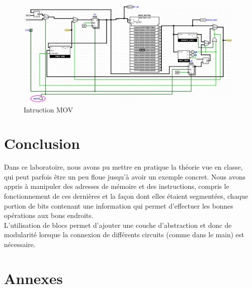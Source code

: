\documentclass[a4paper]{article} %
\begin{document}
\begin{figure}[H]
    \centering
    \includegraphics[width=1\textwidth]{src/FETCH_INTER_1c2c.png}
    \caption{Intruction MOV}
    \label{fetch_inter}
\end{figure}

\section{Conclusion}
Dans ce laboratoire, nous avons pu mettre en pratique la théorie vue en classe, qui peut parfois être un peu floue jusqu'à avoir un exemple concret. Nous avons appris à manipuler des adresses de mémoire et des instructions, compris le fonctionnement de ces dernières et la façon dont elles étaient segmentées, chaque portion de bits contenant une information qui permet d'effectuer les bonnes opérations aux bons endroits. \\
L'utilisation de blocs permet d'ajouter une couche d'abstraction et donc de modularité lorsque la connexion de différents circuits (comme dans le main) est nécessaire.
\section{Annexes}
\end{document}
